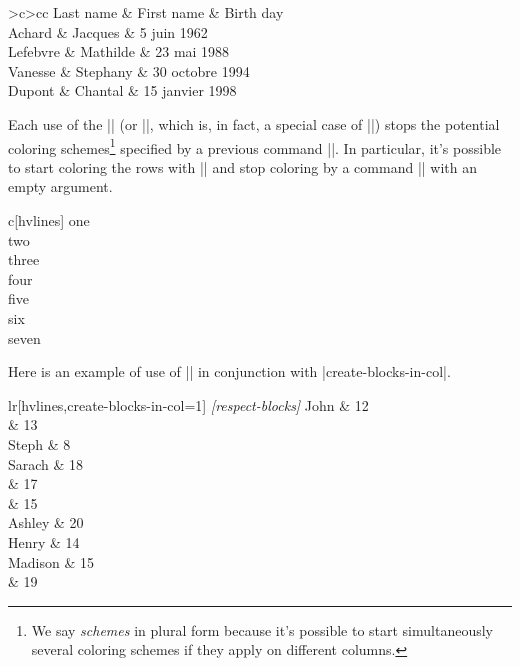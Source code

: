 \documentclass[dvipsnames]{article}
\begin{document}
\smallskip
\begin{Code}
\NewDocumentCommand { \Blue } { } { \emph{} }
\begin{NiceTabular}{>{\Blue}c>{\Blue}cc} 
\toprule
  \emph{}
  Last name & First name & Birth day \\
\midrule
  Achard  & Jacques & 5 juin 1962 \\
  Lefebvre & Mathilde & 23 mai 1988 \\
  Vanesse & Stephany & 30 octobre 1994 \\
  Dupont & Chantal & 15 janvier 1998 \\
\bottomrule
\end{NiceTabular}
\end{Code}


\bigskip
Each use of the |\rowlistcolors| (or |\rowcolors|, which is, in fact, a
special case of |\rowlistcolors|) stops the potential coloring
schemes\footnote{We say \emph{schemes} in plural form because it's possible to
  start simultaneously several coloring schemes if they apply on different
  columns.} specified by a previous command |\rowlistcolors|. In particular,
it's possible to start coloring the rows with || and stop
coloring by a command |\rowlistcolors| with an empty argument.

\bigskip
\begin{Code}[width=10cm,show-output]
\begin{NiceTabular}{c}[hvlines]
  one \\
  two \\
\emph{}
  three \\
  four \\
  five \\
\emph{\rowlistcolors{}}
  six \\
  seven \\
\end{NiceTabular}
\end{Code}

\bigskip
Here is an example of use of |\rowcolors| in conjunction with |create-blocks-in-col|.


\begin{Code}[width=11cm,show-output]
\begin{NiceTabular}{lr}[hvlines,create-blocks-in-col=1]
\emph{[respect-blocks]}
  John      & 12 \\
            & 13 \\
  Steph     &  8 \\
  Sarach    & 18 \\
            & 17 \\
            & 15 \\
  Ashley    & 20 \\
  Henry     & 14 \\
  Madison   & 15 \\
            & 19
\end{NiceTabular}
\end{Code}
\end{document}
